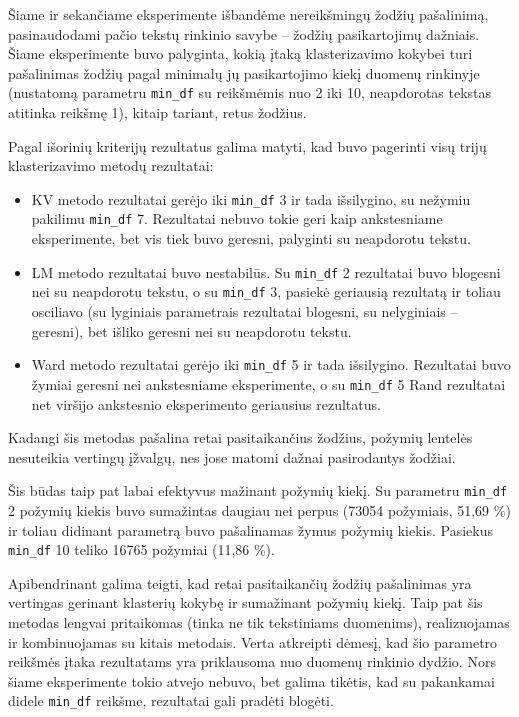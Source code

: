 \documentclass{VUMIFInfBakalaurinis}
\begin{document}
Šiame ir sekančiame eksperimente išbandėme nereikšmingų žodžių
pašalinimą, pasinaudodami pačio tekstų rinkinio savybe -- žodžių
pasikartojimų dažniais. Šiame eksperimente buvo palyginta, kokią įtaką
klasterizavimo kokybei turi pašalinimas žodžių pagal minimalų jų
pasikartojimo kiekį duomenų rinkinyje (nustatomą parametru
\texttt{min\_df} su reikšmėmis nuo 2 iki 10, neapdorotas tekstas
atitinka reikšmę 1), kitaip tariant, retus žodžius.

Pagal išorinių kriterijų rezultatus galima matyti, kad buvo pagerinti
visų trijų klasterizavimo metodų rezultatai:

\begin{itemize}
\item
  KV metodo rezultatai gerėjo iki \texttt{min\_df} 3 ir tada išsilygino, su
  nežymiu pakilimu \texttt{min\_df} 7. Rezultatai nebuvo tokie geri kaip
  ankstesniame eksperimente, bet vis tiek buvo geresni, palyginti su
  neapdorotu tekstu.
\item
  LM metodo rezultatai buvo nestabilūs. Su \texttt{min\_df} 2 rezultatai buvo
  blogesni nei su neapdorotu tekstu, o su \texttt{min\_df} 3, pasiekė geriausią
  rezultatą ir toliau osciliavo (su lyginiais parametrais rezultatai
  blogesni, su nelyginiais -- geresni), bet išliko geresni nei su
  neapdorotu tekstu.
\item
  Ward metodo rezultatai gerėjo iki \texttt{min\_df} 5 ir tada išsilygino.
  Rezultatai buvo žymiai geresni nei ankstesniame eksperimente, o su
  \texttt{min\_df} 5 Rand rezultatai net viršijo ankstesnio eksperimento
  geriausius rezultatus.
\end{itemize}

Kadangi šis metodas pašalina retai pasitaikančius žodžius, požymių
lentelės nesuteikia vertingų įžvalgų, nes jose matomi dažnai
pasirodantys žodžiai.

Šis būdas taip pat labai efektyvus mažinant požymių kiekį. Su parametru
\texttt{min\_df} 2 požymių kiekis buvo sumažintas daugiau nei perpus (73054
požymiais, 51,69 \%) ir toliau didinant parametrą buvo pašalinamas žymus
požymių kiekis. Pasiekus \texttt{min\_df} 10 teliko 16765 požymiai (11,86 \%).

Apibendrinant galima teigti, kad retai pasitaikančių žodžių pašalinimas
yra vertingas gerinant klasterių kokybę ir sumažinant požymių kiekį.
Taip pat šis metodas lengvai pritaikomas (tinka ne tik tekstiniams
duomenims), realizuojamas ir kombinuojamas su kitais metodais. Verta
atkreipti dėmesį, kad šio parametro reikšmės įtaka rezultatams yra
priklausoma nuo duomenų rinkinio dydžio. Nors šiame eksperimente tokio
atvejo nebuvo, bet galima tikėtis, kad su pakankamai didele
\texttt{min\_df} reikšme, rezultatai gali pradėti blogėti.
\end{document}
